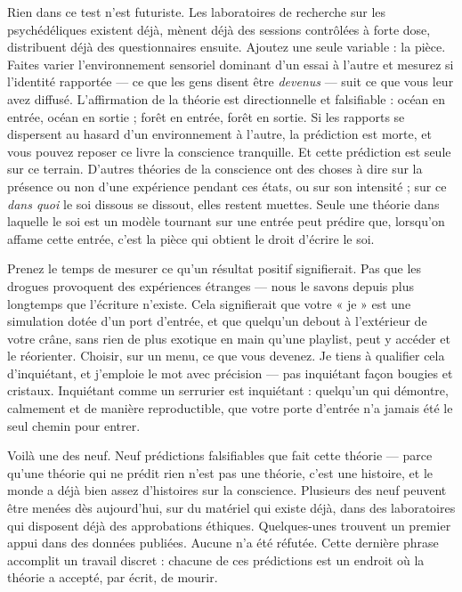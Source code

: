 \documentclass[11pt, twoside, openright]{book}
\begin{document}
Rien dans ce test n'est futuriste. Les laboratoires de recherche sur les psychédéliques existent déjà, mènent déjà des sessions contrôlées à forte dose, distribuent déjà des questionnaires ensuite. Ajoutez une seule variable : la pièce. Faites varier l'environnement sensoriel dominant d'un essai à l'autre et mesurez si l'identité rapportée --- ce que les gens disent être \textit{devenus} --- suit ce que vous leur avez diffusé. L'affirmation de la théorie est directionnelle et falsifiable : océan en entrée, océan en sortie ; forêt en entrée, forêt en sortie. Si les rapports se dispersent au hasard d'un environnement à l'autre, la prédiction est morte, et vous pouvez reposer ce livre la conscience tranquille. Et cette prédiction est seule sur ce terrain. D'autres théories de la conscience ont des choses à dire sur la présence ou non d'une expérience pendant ces états, ou sur son intensité ; sur ce \textit{dans quoi} le soi dissous se dissout, elles restent muettes. Seule une théorie dans laquelle le soi est un modèle tournant sur une entrée peut prédire que, lorsqu'on affame cette entrée, c'est la pièce qui obtient le droit d'écrire le soi.

Prenez le temps de mesurer ce qu'un résultat positif signifierait. Pas que les drogues provoquent des expériences étranges --- nous le savons depuis plus longtemps que l'écriture n'existe. Cela signifierait que votre « je » est une simulation dotée d'un port d'entrée, et que quelqu'un debout à l'extérieur de votre crâne, sans rien de plus exotique en main qu'une playlist, peut y accéder et le réorienter. Choisir, sur un menu, ce que vous devenez. Je tiens à qualifier cela d'inquiétant, et j'emploie le mot avec précision --- pas inquiétant façon bougies et cristaux. Inquiétant comme un serrurier est inquiétant : quelqu'un qui démontre, calmement et de manière reproductible, que votre porte d'entrée n'a jamais été le seul chemin pour entrer.

Voilà une des neuf. Neuf prédictions falsifiables que fait cette théorie --- parce qu'une théorie qui ne prédit rien n'est pas une théorie, c'est une histoire, et le monde a déjà bien assez d'histoires sur la conscience. Plusieurs des neuf peuvent être menées dès aujourd'hui, sur du matériel qui existe déjà, dans des laboratoires qui disposent déjà des approbations éthiques. Quelques-unes trouvent un premier appui dans des données publiées. Aucune n'a été réfutée. Cette dernière phrase accomplit un travail discret : chacune de ces prédictions est un endroit où la théorie a accepté, par écrit, de mourir.
\end{document}
